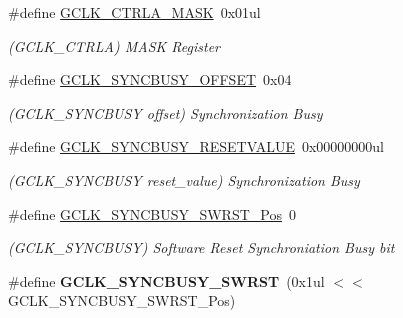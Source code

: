 \begin{DoxyCompactItemize}
\item 
\hypertarget{group___s_a_m_l21___g_c_l_k_ga977e15e98fc8181e3c84060711cdaba2}{}\#define \hyperlink{group___s_a_m_l21___g_c_l_k_ga977e15e98fc8181e3c84060711cdaba2}{G\+C\+L\+K\+\_\+\+C\+T\+R\+L\+A\+\_\+\+M\+A\+S\+K}~0x01ul\label{group___s_a_m_l21___g_c_l_k_ga977e15e98fc8181e3c84060711cdaba2}

\begin{DoxyCompactList}\small\item\em (G\+C\+L\+K\+\_\+\+C\+T\+R\+L\+A) M\+A\+S\+K Register \end{DoxyCompactList}\item 
\hypertarget{group___s_a_m_l21___g_c_l_k_ga1fcf109f21393e43cf19b3880c3ccc67}{}\#define \hyperlink{group___s_a_m_l21___g_c_l_k_ga1fcf109f21393e43cf19b3880c3ccc67}{G\+C\+L\+K\+\_\+\+S\+Y\+N\+C\+B\+U\+S\+Y\+\_\+\+O\+F\+F\+S\+E\+T}~0x04\label{group___s_a_m_l21___g_c_l_k_ga1fcf109f21393e43cf19b3880c3ccc67}

\begin{DoxyCompactList}\small\item\em (G\+C\+L\+K\+\_\+\+S\+Y\+N\+C\+B\+U\+S\+Y offset) Synchronization Busy \end{DoxyCompactList}\item 
\hypertarget{group___s_a_m_l21___g_c_l_k_gadeda6ee021e815b1082be10e6d230a3a}{}\#define \hyperlink{group___s_a_m_l21___g_c_l_k_gadeda6ee021e815b1082be10e6d230a3a}{G\+C\+L\+K\+\_\+\+S\+Y\+N\+C\+B\+U\+S\+Y\+\_\+\+R\+E\+S\+E\+T\+V\+A\+L\+U\+E}~0x00000000ul\label{group___s_a_m_l21___g_c_l_k_gadeda6ee021e815b1082be10e6d230a3a}

\begin{DoxyCompactList}\small\item\em (G\+C\+L\+K\+\_\+\+S\+Y\+N\+C\+B\+U\+S\+Y reset\+\_\+value) Synchronization Busy \end{DoxyCompactList}\item 
\hypertarget{group___s_a_m_l21___g_c_l_k_ga32d54c0380b80778c20ea5224206bc40}{}\#define \hyperlink{group___s_a_m_l21___g_c_l_k_ga32d54c0380b80778c20ea5224206bc40}{G\+C\+L\+K\+\_\+\+S\+Y\+N\+C\+B\+U\+S\+Y\+\_\+\+S\+W\+R\+S\+T\+\_\+\+Pos}~0\label{group___s_a_m_l21___g_c_l_k_ga32d54c0380b80778c20ea5224206bc40}

\begin{DoxyCompactList}\small\item\em (G\+C\+L\+K\+\_\+\+S\+Y\+N\+C\+B\+U\+S\+Y) Software Reset Synchroniation Busy bit \end{DoxyCompactList}\item 
\hypertarget{group___s_a_m_l21___g_c_l_k_ga0d76afa5af036796e7310ab9b391d847}{}\#define {\bfseries G\+C\+L\+K\+\_\+\+S\+Y\+N\+C\+B\+U\+S\+Y\+\_\+\+S\+W\+R\+S\+T}~(0x1ul $<$$<$ G\+C\+L\+K\+\_\+\+S\+Y\+N\+C\+B\+U\+S\+Y\+\_\+\+S\+W\+R\+S\+T\+\_\+\+Pos)\label{group___s_a_m_l21___g_c_l_k_ga0d76afa5af036796e7310ab9b391d847}


\end{DoxyCompactItemize}
